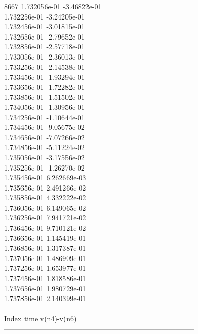 8667	1.732056e-01	-3.46822e-01	\\ 	1.732256e-01	-3.24205e-01	\\ 	1.732456e-01	-3.01815e-01	\\ 	1.732656e-01	-2.79652e-01	\\ 	1.732856e-01	-2.57718e-01	\\ 	1.733056e-01	-2.36013e-01	\\ 	1.733256e-01	-2.14538e-01	\\ 	1.733456e-01	-1.93294e-01	\\ 	1.733656e-01	-1.72282e-01	\\ 	1.733856e-01	-1.51502e-01	\\ 	1.734056e-01	-1.30956e-01	\\ 	1.734256e-01	-1.10644e-01	\\ 	1.734456e-01	-9.05675e-02	\\ 	1.734656e-01	-7.07266e-02	\\ 	1.734856e-01	-5.11224e-02	\\ 	1.735056e-01	-3.17556e-02	\\ 	1.735256e-01	-1.26270e-02	\\ 	1.735456e-01	6.262669e-03	\\ 	1.735656e-01	2.491266e-02	\\ 	1.735856e-01	4.332222e-02	\\ 	1.736056e-01	6.149065e-02	\\ 	1.736256e-01	7.941721e-02	\\ 	1.736456e-01	9.710121e-02	\\ 	1.736656e-01	1.145419e-01	\\ 	1.736856e-01	1.317387e-01	\\ 	1.737056e-01	1.486909e-01	\\ 	1.737256e-01	1.653977e-01	\\ 	1.737456e-01	1.818586e-01	\\ 	1.737656e-01	1.980729e-01	\\ 	1.737856e-01	2.140399e-01	\\ \hline
\\ \hline
Index   time            v(n4)-v(n6)     \\ \hline
--------------------------------------------------------------------------------\\ \hline
